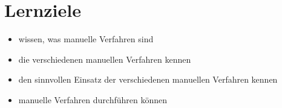 \section{Lernziele}

\begin{itemize}
    \item wissen, was manuelle Verfahren sind
    \item die verschiedenen manuellen Verfahren kennen
    \item den sinnvollen Einsatz der verschiedenen manuellen Verfahren kennen
    \item manuelle Verfahren durchführen können
\end{itemize}
